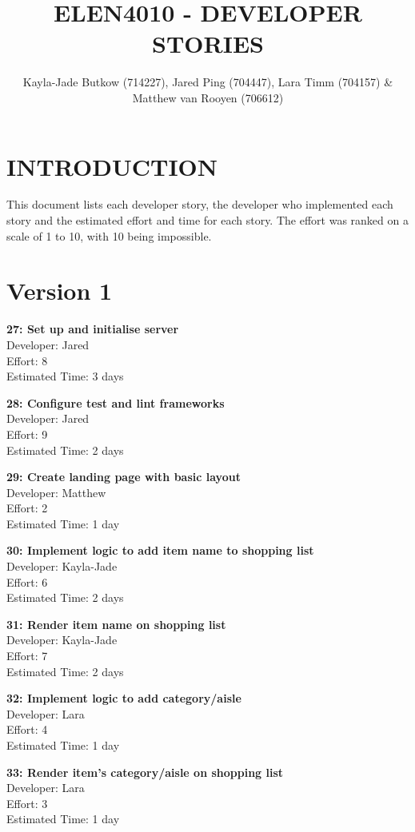 \documentclass[10pt,onecolumn]{witseiepaper}
\title{ELEN4010 - DEVELOPER STORIES}
\author{Kayla-Jade Butkow (714227), Jared Ping (704447), Lara Timm (704157) \& Matthew van Rooyen (706612)}
\begin{document}
	\maketitle
	\pagestyle{plain}
	\setcounter{page}{1}
	
\section*{INTRODUCTION}
This document lists each developer story, the developer who implemented each story and the estimated effort and time for each story. The effort was ranked on a scale of 1 to 10, with 10 being impossible.

\section*{Version 1}
\textbf{27: Set up and initialise server} \\
Developer: Jared\\
Effort: 8\\
Estimated Time: 3 days

\textbf{28: Configure test and lint frameworks} \\
Developer: Jared \\
Effort: 9 \\
Estimated Time: 2 days

\textbf{29: Create landing page with basic layout} \\
Developer: Matthew \\
Effort: 2\\
Estimated Time: 1 day

\textbf{30: Implement logic to add item name to shopping list} \\
Developer: Kayla-Jade\\
Effort: 6\\
Estimated Time: 2 days

\textbf{31: Render item name on shopping list} \\
Developer: Kayla-Jade\\
Effort: 7\\
Estimated Time: 2 days

\textbf{32: Implement logic to add category/aisle} \\
Developer: Lara \\
Effort: 4\\
Estimated Time: 1 day

\textbf{33: Render item's category/aisle on shopping list} \\
Developer: Lara\\
Effort: 3\\
Estimated Time: 1 day
\end{document}
